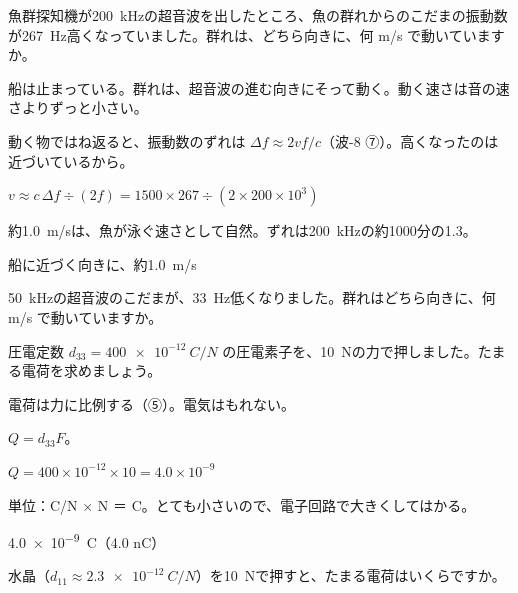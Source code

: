 \begin{reidai}
\label{ph:波-10:ex8}魚群探知機が\qty{200}{kHz}の超音波を出したところ、魚の群れからのこだまの振動数が\qty{267}{Hz}高くなっていました。群れは、どちら向きに、何 m/s で動いていますか。
\par{} 船は止まっている。群れは、超音波の進む向きにそって動く。動く速さは音の速さよりずっと小さい。
\par\kangaekata 動く物ではね返ると、振動数のずれは $\Delta f\approx2vf/c$（波-8 ⑦）。高くなったのは近づいているから。
\par\shiki $v\approx c\,\Delta f\div(2f)=1500\times267\div(2\times200\times10^3)$
\par{} 約\qty{1.0}{m/s}は、魚が泳ぐ速さとして自然。ずれは\qty{200}{kHz}の約1000分の1.3。
\par\kotae 船に近づく向きに、約\qty{1.0}{m/s}
\end{reidai}
\begin{jibun}
\qty{50}{kHz}の超音波のこだまが、\qty{33}{Hz}低くなりました。群れはどちら向きに、何 m/s で動いていますか。
\end{jibun}

\begin{reidai}[圧電素子にたまる電気]
\label{ph:波-10:ex9}圧電定数 $d_{33}=\qty{400e-12}{C/N}$ の圧電素子を、\qty{10}{N}の力で押しました。たまる電荷を求めましょう。
\par{} 電荷は力に比例する（⑤）。電気はもれない。
\par\kangaekata $Q=d_{33}F$。
\par\shiki $Q=400\times10^{-12}\times10=4.0\times10^{-9}$
\par{} 単位：C/N × N ＝ C。とても小さいので、電子回路で大きくしてはかる。
\par\kotae \qty{4.0e-9}{C}（4.0 nC）
\end{reidai}
\begin{jibun}
水晶（$d_{11}\approx\qty{2.3e-12}{C/N}$）を\qty{10}{N}で押すと、たまる電荷はいくらですか。
\end{jibun}

